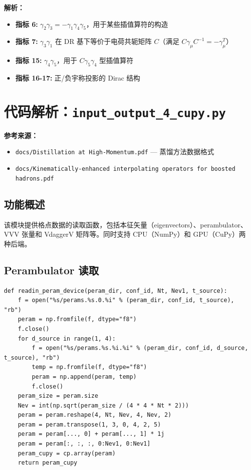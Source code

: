\documentclass[12pt,a4paper]{ctexart}
\begin{document}
\textbf{解析：}
\begin{itemize}
    \item \textbf{指标 6:} $\gamma_2\gamma_3 = -\gamma_1\gamma_4\gamma_5$，用于某些插值算符的构造
    \item \textbf{指标 7:} $\gamma_3\gamma_1$ 在 DR 基下等价于电荷共轭矩阵 $C$（满足 $C\gamma_\mu C^{-1} = -\gamma_\mu^T$）
    \item \textbf{指标 15:} $\gamma_4\gamma_5$，用于 $C\gamma_5\gamma_4$ 型插值算符
    \item \textbf{指标 16-17:} 正/负宇称投影的 Dirac 结构
\end{itemize}

\section{代码解析：\texttt{input\_output\_4\_cupy.py}}
\label{sec:io}

\textbf{参考来源：}
\begin{itemize}
    \item \texttt{docs/Distillation at High-Momentum.pdf} — 蒸馏方法数据格式
    \item \texttt{docs/Kinematically-enhanced interpolating operators for boosted hadrons.pdf}
\end{itemize}

\subsection{功能概述}

该模块提供格点数据的读取函数，包括本征矢量（eigenvectors）、perambulator、VVV 张量和 VdaggerV 矩阵等。同时支持 CPU（NumPy）和 GPU（CuPy）两种后端。

\subsection{Perambulator 读取}

\begin{lstlisting}[caption={读取 Perambulator（GPU 版本）}]
def readin_peram_device(peram_dir, conf_id, Nt, Nev1, t_source):
    f = open("%s/perams.%s.0.%i" % (peram_dir, conf_id, t_source), "rb")
    peram = np.fromfile(f, dtype="f8")
    f.close()
    for d_source in range(1, 4):
        f = open("%s/perams.%s.%i.%i" % (peram_dir, conf_id, d_source, t_source), "rb")
        temp = np.fromfile(f, dtype="f8")
        peram = np.append(peram, temp)
        f.close()
    peram_size = peram.size
    Nev = int(np.sqrt(peram_size / (4 * 4 * Nt * 2)))
    peram = peram.reshape(4, Nt, Nev, 4, Nev, 2)
    peram = peram.transpose(1, 3, 0, 4, 2, 5)
    peram = peram[..., 0] + peram[..., 1] * 1j
    peram = peram[:, :, :, 0:Nev1, 0:Nev1]
    peram_cupy = cp.array(peram)
    return peram_cupy
\end{lstlisting}
\end{document}

